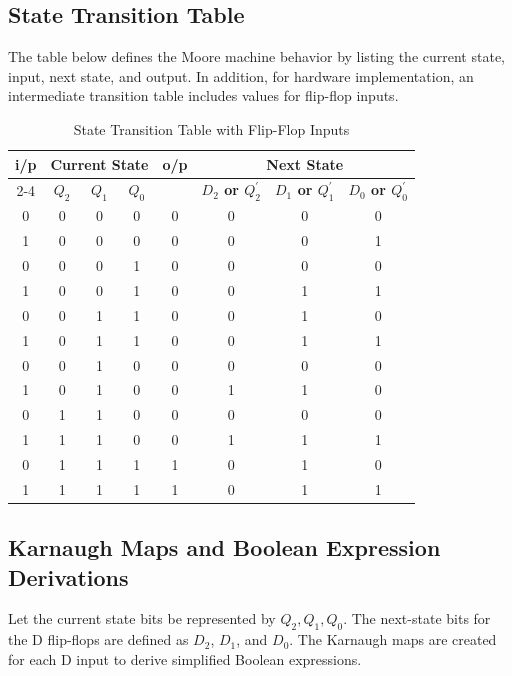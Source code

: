 \documentclass{article}
\begin{document}
\subsection{State Transition Table}
The table below defines the Moore machine behavior by listing the current state, input, next state, and output. In addition, for hardware implementation, an intermediate transition table includes values for flip-flop inputs.

\begin{table}[H]
\centering
\label{tab:transition}
\begin{tabular}{|c|c|c|c|c|c|c|c|}
\hline
\textbf{i/p} & \multicolumn{3}{c|}{\textbf{Current State}} & \textbf{o/p} & \multicolumn{3}{c|}{\textbf{Next State}} \\
\cline{2-4}\cline{6-8}
 & \textbf{$Q_2$} & \textbf{$Q_1$} & \textbf{$Q_0$} &  & \textbf{$D_2$ or $Q_2^{\prime}$} & \textbf{$D_1$ or $Q_1^{\prime}$} & \textbf{$D_0$ or $Q_0^{\prime}$} \\
\hline
0 & 0 & 0 & 0 & 0 & 0 & 0 & 0 \\
1 & 0 & 0 & 0 & 0 & 0 & 0 & 1 \\
0 & 0 & 0 & 1 & 0 & 0 & 0 & 0 \\
1 & 0 & 0 & 1 & 0 & 0 & 1 & 1 \\
0 & 0 & 1 & 1 & 0 & 0 & 1 & 0 \\
1 & 0 & 1 & 1 & 0 & 0 & 1 & 1 \\
0 & 0 & 1 & 0 & 0 & 0 & 0 & 0 \\
1 & 0 & 1 & 0 & 0 & 1 & 1 & 0 \\
0 & 1 & 1 & 0 & 0 & 0 & 0 & 0 \\
1 & 1 & 1 & 0 & 0 & 1 & 1 & 1 \\
0 & 1 & 1 & 1 & 1 & 0 & 1 & 0 \\
1 & 1 & 1 & 1 & 1 & 0 & 1 & 1 \\
\hline
\end{tabular}
\caption{State Transition Table with Flip-Flop Inputs}
\end{table}

\subsection{Karnaugh Maps and Boolean Expression Derivations}
Let the current state bits be represented by $Q_2, Q_1, Q_0$.
The next-state bits for the D flip-flops are defined as $D_2$, $D_1$, and $D_0$. The Karnaugh maps are created for each D input to derive simplified Boolean expressions.
\end{document}
